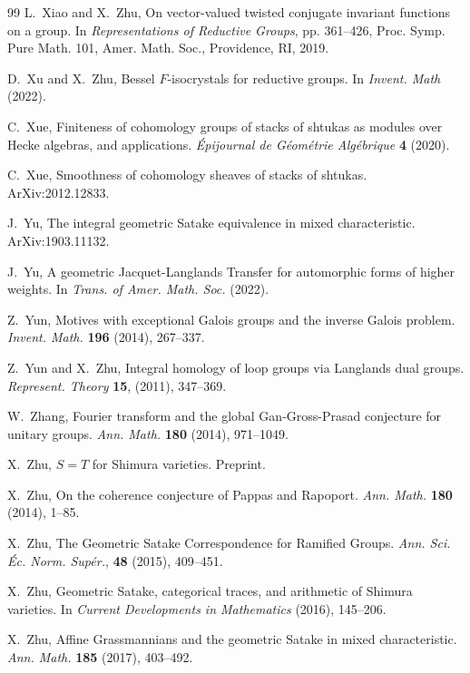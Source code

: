 \begin{thebibliography}{99}
L.~Xiao and X.~Zhu, On vector-valued twisted conjugate invariant functions on a group. In \emph{Representations of Reductive Groups}, pp. 361--426, Proc. Symp. Pure Math. 101, Amer. Math. Soc., Providence, RI, 2019.

D.~Xu and X.~Zhu, Bessel $F$-isocrystals for reductive groups. In \emph{Invent. Math} (2022).

C.~Xue, Finiteness of cohomology groups of stacks of shtukas as modules over Hecke algebras, and applications. \emph{\'Epijournal de G\'eom\'etrie Alg\'ebrique} \textbf{4} (2020).

C.~Xue, Smoothness of cohomology sheaves of stacks of shtukas. ArXiv:2012.12833.

J.~Yu, The integral geometric Satake equivalence in mixed characteristic. ArXiv:1903.11132.

J.~Yu, A geometric Jacquet-Langlands Transfer for automorphic forms of higher weights. In \emph{Trans. of Amer. Math. Soc.} (2022).

Z.~Yun, Motives with exceptional Galois groups and the inverse Galois problem. \emph{Invent. Math.} \textbf{196} (2014), 267--337.

Z.~Yun and X.~Zhu, Integral homology of loop groups via Langlands dual groups. \emph{Represent. Theory} \textbf{15}, (2011), 347--369.

W.~Zhang, Fourier transform and the global Gan-Gross-Prasad conjecture for unitary groups. \emph{Ann. Math.} \textbf{180} (2014), 971--1049.

X.~Zhu, $S=T$ for Shimura varieties. Preprint.

X.~Zhu, On the coherence conjecture of Pappas and Rapoport. \emph{Ann. Math.} \textbf{180} (2014), 1--85.

X.~Zhu, The Geometric Satake Correspondence for Ramified Groups. \emph{Ann. Sci. \'Ec. Norm. Sup\'er.}, \textbf{48} (2015),  409--451.

X.~Zhu, Geometric Satake, categorical traces, and arithmetic of Shimura varieties. In \emph{Current Developments in Mathematics} (2016), 145--206.

X.~Zhu, Affine Grassmannians and the geometric Satake in mixed characteristic. \emph{Ann. Math.} \textbf{185} (2017), 403--492.


\end{thebibliography}
